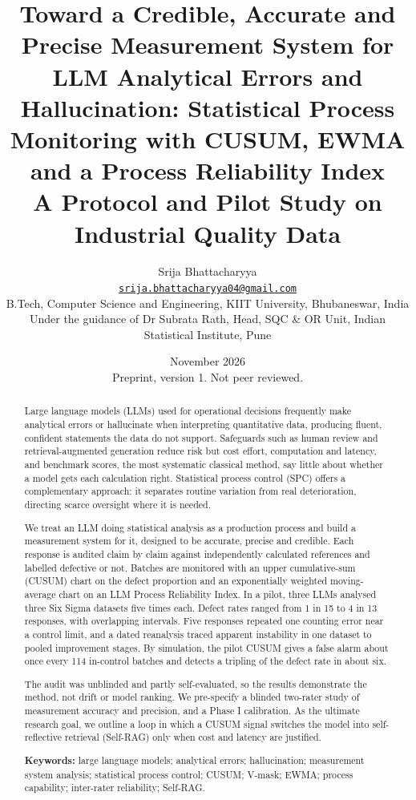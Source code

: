 \documentclass[11pt]{article}
\title{Toward a Credible, Accurate and Precise Measurement System for LLM Analytical Errors and Hallucination: Statistical Process Monitoring with CUSUM, EWMA and a Process Reliability Index\\[0.3em]
\large A Protocol and Pilot Study on Industrial Quality Data}
\author{Srija Bhattacharyya\\[0.1em]
\small \href{mailto:srija.bhattacharyya04@gmail.com}{\texttt{srija.bhattacharyya04@gmail.com}}\\[0.2em]
\small B.Tech, Computer Science and Engineering, KIIT University, Bhubaneswar, India\\
\small Under the guidance of Dr Subrata Rath, Head, SQC \& OR Unit, Indian Statistical Institute, Pune}
\date{November 2026\\[0.3em]\small Preprint, version 1. Not peer reviewed.}
\begin{document}
\maketitle

\begin{abstract}
\noindent Large language models (LLMs) used for operational decisions frequently make analytical errors or hallucinate when interpreting quantitative data, producing fluent, confident statements the data do not support. Safeguards such as human review and retrieval-augmented generation reduce risk but cost effort, computation and latency, and benchmark scores, the most systematic classical method, say little about whether a model gets each calculation right. Statistical process control (SPC) offers a complementary approach: it separates routine variation from real deterioration, directing scarce oversight where it is needed.\par\smallskip\noindent We treat an LLM doing statistical analysis as a production process and build a measurement system for it, designed to be accurate, precise and credible. Each response is audited claim by claim against independently calculated references and labelled defective or not. Batches are monitored with an upper cumulative-sum (CUSUM) chart on the defect proportion and an exponentially weighted moving-average chart on an LLM Process Reliability Index. In a pilot, three LLMs analysed three Six Sigma datasets five times each. Defect rates ranged from 1 in 15 to 4 in 13 responses, with overlapping intervals. Five responses repeated one counting error near a control limit, and a dated reanalysis traced apparent instability in one dataset to pooled improvement stages. By simulation, the pilot CUSUM gives a false alarm about once every 114 in-control batches and detects a tripling of the defect rate in about six.\par\smallskip\noindent The audit was unblinded and partly self-evaluated, so the results demonstrate the method, not drift or model ranking. We pre-specify a blinded two-rater study of measurement accuracy and precision, and a Phase I calibration. As the ultimate research goal, we outline a loop in which a CUSUM signal switches the model into self-reflective retrieval (Self-RAG) only when cost and latency are justified.

\medskip\noindent\textbf{Keywords:} large language models; analytical errors; hallucination; measurement system analysis; statistical process control; CUSUM; V-mask; EWMA; process capability; inter-rater reliability; Self-RAG.
\end{abstract}
\end{document}

